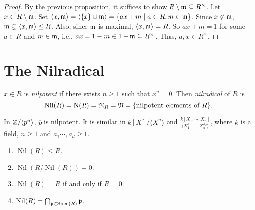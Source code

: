 \begin{proof}
    By the previous proposition, it suffices to show $R \setminus \mathfrak{m} \subseteq R^\times$. Let $x \in R \setminus \mathfrak{m}$. Set $\langle x, \mathfrak{m} \rangle = \langle \{x\} \cup \mathfrak{m} \rangle = \{ax+m \mid a \in R, m \in \mathfrak{m}\}$. Since $x \not \in \mathfrak{m}$, $\mathfrak{m} \subsetneq \langle x, \mathfrak{m} \rangle \leq R$. Also, since $\mathfrak{m}$ is maximal, $\langle x,\mathfrak{m} \rangle = R$. So $ax + m = 1$ for some $a \in R$ and $m \in \mathfrak{m}$, i.e., $ax = 1-m \in 1 + \mathfrak{m} \subseteq R^\times$. Thus, $a,x \in R^\times$.
\end{proof}

\section*{The Nilradical}

\begin{definition}
    $x \in R$ is \emph{nilpotent} if there exists $n \geq 1$ such that $x^n = 0$. Then \emph{nilradical} of $R$ is 
    \[\operatorname{Nil}(R) = \operatorname{N}(R) = \mathfrak{N}_R = \mathfrak{N} = \{\text{nilpotent elements of }R\}.\]
\end{definition}

\begin{example}
    In $\mathbb{Z}/\langle p^n \rangle$, $\overbar p$ is nilpotent. It is similar in $k[X]/\langle X^n \rangle$ and $\frac{k[X_1,\cdots,X_n]}{\langle X_1^{a_1},\cdots,X_d^{a_d}\rangle}$, where $k$ is a field, $n \geq 1$ and $a_1\cdots,a_d \geq 1$.
\end{example}

\begin{proposition}
    \begin{enumerate}
        \item $\operatorname{Nil}(R) \leq R$.
        \item $\operatorname{Nil}(R/\operatorname{Nil}(R)) = 0$.
        \item $\operatorname{Nil}(R) = R$ if and only if $R = 0$.
        \item $\operatorname{Nil}(R) = \bigcap_{\mathfrak{p} \in \operatorname{Spec}(R)}\mathfrak{p}$.
    \end{enumerate}
\end{proposition}

